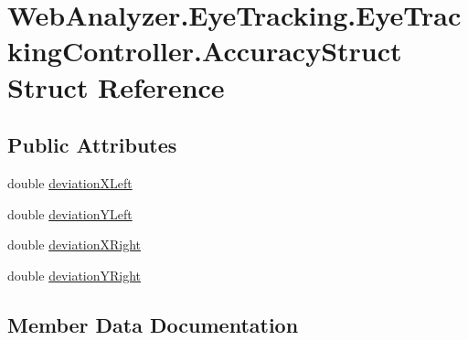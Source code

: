 \hypertarget{struct_web_analyzer_1_1_eye_tracking_1_1_eye_tracking_controller_1_1_accuracy_struct}{}\section{Web\+Analyzer.\+Eye\+Tracking.\+Eye\+Tracking\+Controller.\+Accuracy\+Struct Struct Reference}
\label{struct_web_analyzer_1_1_eye_tracking_1_1_eye_tracking_controller_1_1_accuracy_struct}
\subsection*{Public Attributes}
\begin{DoxyCompactItemize}
\item 
double \hyperlink{struct_web_analyzer_1_1_eye_tracking_1_1_eye_tracking_controller_1_1_accuracy_struct_a9c5083897aef0f02694217dc9b8add3a}{deviation\+X\+Left}
\item 
double \hyperlink{struct_web_analyzer_1_1_eye_tracking_1_1_eye_tracking_controller_1_1_accuracy_struct_a1c3224b3dc852fab2daddef15741f080}{deviation\+Y\+Left}
\item 
double \hyperlink{struct_web_analyzer_1_1_eye_tracking_1_1_eye_tracking_controller_1_1_accuracy_struct_ad2e49956dcab46900aa056f566d2f713}{deviation\+X\+Right}
\item 
double \hyperlink{struct_web_analyzer_1_1_eye_tracking_1_1_eye_tracking_controller_1_1_accuracy_struct_a1f188a004ecaf067028b9695647d0c7e}{deviation\+Y\+Right}
\end{DoxyCompactItemize}


\subsection{Member Data Documentation}
\hypertarget{struct_web_analyzer_1_1_eye_tracking_1_1_eye_tracking_controller_1_1_accuracy_struct_a9c5083897aef0f02694217dc9b8add3a}{}
